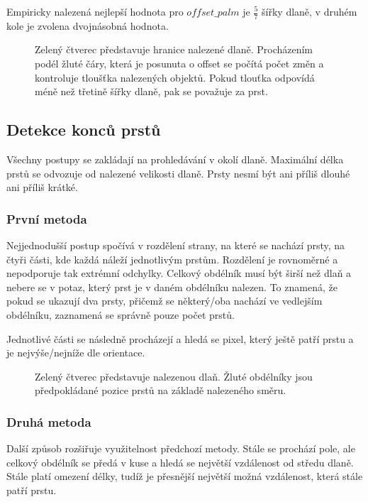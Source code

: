 Empiricky nalezená nejlepší hodnota pro $ offset\_palm $ je $ \frac{5}{7} $ šířky dlaně, v druhém kole je zvolena dvojnásobná hodnota. 

\begin{figure}[htp]
\centering
{}
\caption{Zelený čtverec představuje hranice nalezené dlaně. Procházením podél žluté čáry, která je posunuta o offset se počítá počet změn a kontroluje tloušťka nalezených objektů. Pokud tlouťka odpovídá méně než třetině šířky dlaně, pak se považuje za prst.}
\label{pic19}
\end{figure}
\newpage
\subsection{Detekce konců prstů}
Všechny postupy se zakládají na prohledávání v okolí dlaně. Maximální délka prstů se odvozuje od nalezené velikosti dlaně. Prsty nesmí být ani příliš dlouhé ani příliš krátké.\\

\subsubsection{První metoda}
Nejjednodušší postup spočívá v rozdělení strany, na které se nachází prsty, na čtyři části, kde každá náleží jednotlivým prstům. Rozdělení je rovnoměrné a nepodporuje tak extrémní odchylky. Celkový obdélník musí být širší než dlaň a nebere se v potaz, který prst je v daném obdélníku nalezen. To znamená, že pokud se ukazují dva prsty, přičemž se některý/oba nachází ve vedlejším obdélníku, zaznamená se správně pouze počet prstů.

Jednotlivé části se následně procházejí a hledá se pixel, který ještě patří prstu a je nejvýše/nejníže dle orientace.\\

\begin{figure}[htp]
\centering
{}
\caption{Zelený čtverec představuje nalezenou dlaň. Žluté obdélníky jsou předpokládané pozice prstů na základě nalezeného směru.}
\label{pic20}
\end{figure}

\subsubsection{Druhá metoda}
Další způsob rozšiřuje využitelnost předchozí metody. Stále se prochází pole, ale celkový obdélník se předá v kuse a hledá se největší vzdálenost od středu dlaně. Stále platí omezení délky, tudíž je přesnější největší možná vzdálenost, která stále patří prstu.

